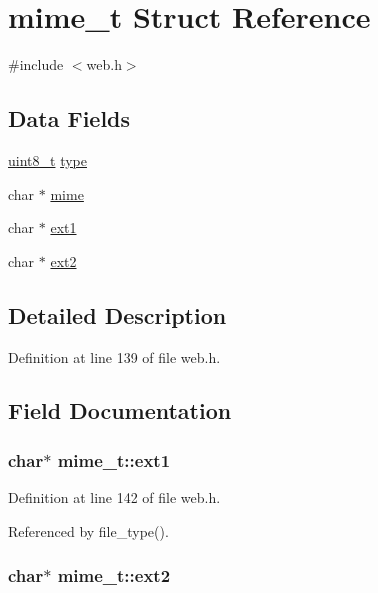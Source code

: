 \hypertarget{structmime__t}{\section{mime\-\_\-t Struct Reference}
\label{structmime__t}
}


{\ttfamily \#include $<$web.\-h$>$}

\subsection*{Data Fields}
\begin{DoxyCompactItemize}
\item 
\hyperlink{send_8c_aba7bc1797add20fe3efdf37ced1182c5}{uint8\-\_\-t} \hyperlink{structmime__t_ae69826dcfd475d65fa0fe8a1574bb3af}{type}
\item 
char $\ast$ \hyperlink{structmime__t_ad796d16eaee60d7435bff66b2e9b8a8d}{mime}
\item 
char $\ast$ \hyperlink{structmime__t_a22af12abb536a48d3425a3a4d1cce2a4}{ext1}
\item 
char $\ast$ \hyperlink{structmime__t_ae16e9342ecd4df97a2564658f1f506b1}{ext2}
\end{DoxyCompactItemize}


\subsection{Detailed Description}


Definition at line 139 of file web.\-h.



\subsection{Field Documentation}
\hypertarget{structmime__t_a22af12abb536a48d3425a3a4d1cce2a4}{
\subsubsection[{ext1}]{\setlength{\rightskip}{0pt plus 5cm}char$\ast$ mime\-\_\-t\-::ext1}}\label{structmime__t_a22af12abb536a48d3425a3a4d1cce2a4}


Definition at line 142 of file web.\-h.



Referenced by file\-\_\-type().

\hypertarget{structmime__t_ae16e9342ecd4df97a2564658f1f506b1}{
\subsubsection[{ext2}]{\setlength{\rightskip}{0pt plus 5cm}char$\ast$ mime\-\_\-t\-::ext2}}\label{structmime__t_ae16e9342ecd4df97a2564658f1f506b1}


